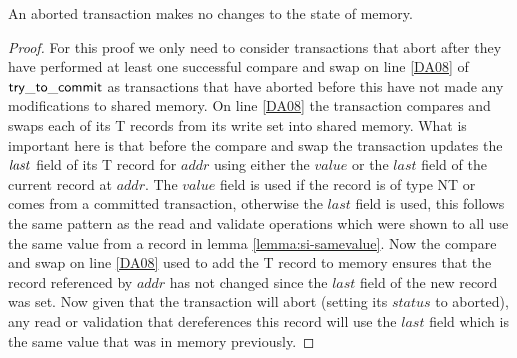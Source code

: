 \begin{lemma}
\label{lemma:si-abort}
An aborted transaction makes no changes to the state of memory.
\end{lemma}
\begin{proof}
For this proof we only need to consider transactions that abort after they have performed
at least one successful compare and swap on line \ref{DA08} of $\sf{try\_to\_commit}$ as transactions
that have aborted before this have not made any modifications to shared memory.
On line \ref{DA08} the transaction compares and swaps each of its T records from its write set into
shared memory.
What is important here is that before the compare and swap the transaction updates the $\ms{last}$
field of its T record for $\mathit{addr}$ using either the $\mathit{value}$ or the $\mathit{last}$ field of the current
record at $\mathit{addr}$.
The $\mathit{value}$ field is used if the record is of type NT or comes from a committed transaction, otherwise the $\mathit{last}$
field is used, this follows the same pattern as the read and validate operations which were shown to all use the same value
from a record in lemma \ref{lemma:si-samevalue}.
Now the compare and swap on line \ref{DA08} used to add the T record to memory ensures that the record referenced by $\mathit{addr}$ has not
changed since the $\mathit{last}$ field of the new record was set.
Now given that the transaction will abort (setting its $\mathit{status}$ to aborted), any read or validation that dereferences
this record will use the $\mathit{last}$ field which is the same value that was in memory previously.
\end{proof}




